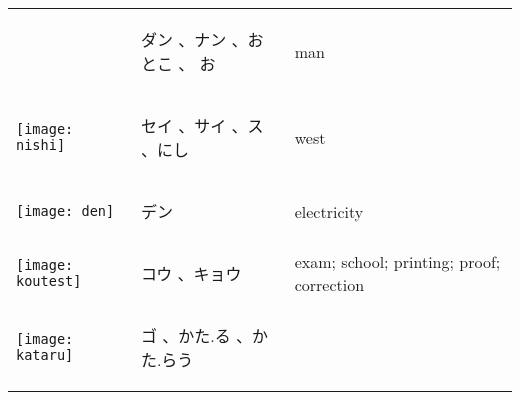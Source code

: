 \documentclass[a4paper,12pt]{extarticle}
\begin{document}
\begin{longtable}{|lp{6cm}p{4cm}|}
	                                   &
	\begin{CJK}{UTF8}{min}ダン 、ナン 、おとこ 、 お\end{CJK}
	                                   &
	man
	\\
	\begin{minipage}{0.3\textwidth}
		\centerline{
			\texttt{[image: nishi]}
		}
	\end{minipage}
	                                   &
	\begin{CJK}{UTF8}{min} セイ 、サイ 、ス 、にし\end{CJK}
	                                   &
	west
	\\
	\begin{minipage}{0.3\textwidth}
		\centerline{
			\texttt{[image: den]}
		}
	\end{minipage}
	                                   &
	\begin{CJK}{UTF8}{min}デン\end{CJK}
	                                   &
	electricity
	\\
	\begin{minipage}{0.3\textwidth}
		\centerline{
			\texttt{[image: koutest]}
		}
	\end{minipage}
	                                   &
	\begin{CJK}{UTF8}{min} コウ 、キョウ\end{CJK}
	                                   &
	exam; school; printing; proof; correction
	\\
	\begin{minipage}{0.3\textwidth}
		\centerline{
			\texttt{[image: kataru]}
		}
	\end{minipage}
	                                   &
	\begin{CJK}{UTF8}{min} ゴ 、かた.る 、かた.らう\end{CJK}

\end{longtable}
\end{document}
